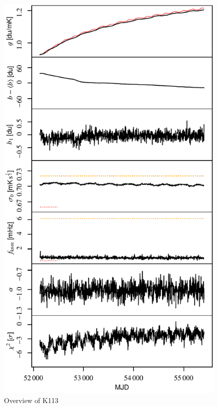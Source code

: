 \documentclass[twocolumn]{../../common/aa}
\begin{document}
\begin{figure}[t]
  	\centering
	\includegraphics[width=\linewidth]{figures/instpar_CG_K113_v1.pdf}
	\caption{Overview of K113}
	\label{fig:inst_K113}
\end{figure}
\end{document}

